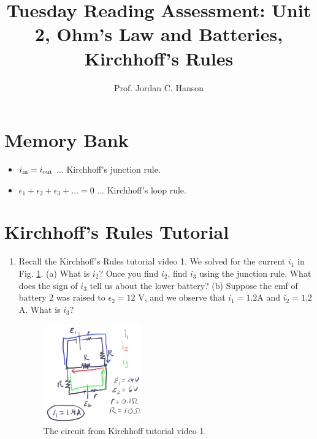 \documentclass{article}
\begin{document}
\title{Tuesday Reading Assessment: Unit 2, Ohm's Law and Batteries, Kirchhoff's Rules}
\author{Prof. Jordan C. Hanson}

\maketitle

\section{Memory Bank}

\begin{itemize}
\item $i_{\rm in} = i_{\rm out}$ ... Kirchhoff's junction rule.
\item $\epsilon_1 + \epsilon_2 + \epsilon_3 + ... = 0$ ... Kirchhoff's loop rule.
\end{itemize}

\section{Kirchhoff's Rules Tutorial}

\begin{enumerate}
\item Recall the Kirchhoff's Rules tutorial video 1.  We solved for the current $i_1$ in Fig. \ref{fig:dura}. (a) What is $i_2$? Once you find $i_2$, find $i_3$ using the junction rule.  What does the sign of $i_3$ tell us about the lower battery? (b) Suppose the emf of battery 2 was raised to $\epsilon_2 = 12$ V, and we observe that $i_1 = 1.2$A and $i_2 = 1.2$A. What is $i_3$?
\begin{figure}[ht]
\centering
\includegraphics[width=0.4\textwidth]{kirchhoff_tutorial_circuit1.png}
\caption{\label{fig:dura} The circuit from Kirchhoff tutorial video 1.}
\end{figure}
\end{enumerate}
\end{document}
